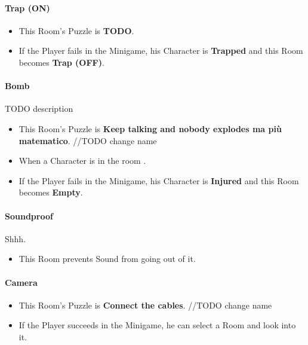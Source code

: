 \paragraph{Trap (ON)}
\begin{itemize}
	\item This Room's Puzzle is \textbf{TODO}.
	\item If the Player fails    in the Minigame, his Character is \textbf{Trapped} and this Room becomes \textbf{Trap (OFF)}.
\end{itemize}

\paragraph{Bomb} TODO description
\begin{itemize}
	\item This Room's Puzzle is \textbf{Keep talking and nobody explodes ma più matematico}. //TODO change name
	\item When a Character is in the room .
	\item If the Player fails    in the Minigame, his Character is \textbf{Injured} and this Room becomes \textbf{Empty}.
\end{itemize}

\paragraph{Soundproof} Shhh.
\begin{itemize}
	\item This Room prevents Sound from going out of it.
\end{itemize}

\paragraph{Camera} 
\begin{itemize}
	\item This Room's Puzzle is \textbf{Connect the cables}. //TODO change name
	\item If the Player succeeds in the Minigame, he can select a Room and look into it.
\end{itemize}

